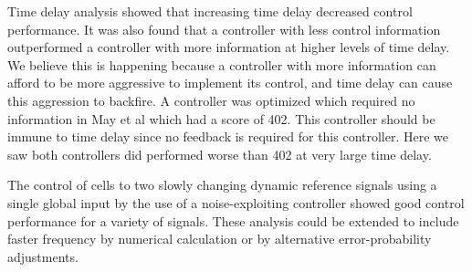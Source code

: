 \documentclass[12pt]{article}
\begin{document}
Time delay analysis showed that increasing time delay decreased control performance. It was also found that a controller with less control information outperformed a controller with more information at higher levels of time delay. We believe this is happening because a controller with more information can afford to be more aggressive to implement its control, and time delay can cause this aggression to backfire. A controller was optimized which required no information in May et al which had a score of 402. This controller should be immune to time delay since no feedback is required for this controller. Here we saw both controllers did performed worse than 402 at very large time delay.

The control of cells to two slowly changing dynamic reference signals using a single global input by the use of a noise-exploiting controller showed good control performance for a variety of signals. These analysis could be extended to include faster frequency by numerical calculation or by alternative error-probability adjustments.
\end{document}
